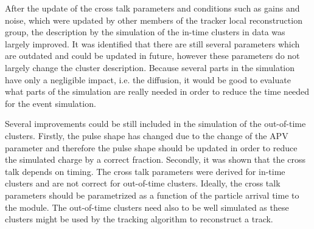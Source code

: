 


After the update of the cross talk parameters and conditions such as gains and noise, which were updated by other members of the tracker local reconstruction group, the description by the simulation of the in-time clusters in data was largely improved. It was identified that there are still several parameters which are outdated and could be  updated in future, however these parameters do not largely change the cluster description. Because several parts in the simulation have only a negligible impact, i.e. the diffusion, it would be good to evaluate what parts of the simulation are really needed in order to reduce the time needed for the event simulation.

Several improvements could be still included in the simulation of the out-of-time clusters. Firstly, the pulse shape has changed due to the change of the APV parameter and therefore the pulse shape should be updated in order to reduce the simulated charge by a correct fraction. Secondly, it was shown that the cross talk depends on timing. The cross talk parameters were derived for in-time clusters and are not correct for out-of-time clusters. Ideally, the cross talk parameters should be parametrized as a function of the particle arrival time to the module. The out-of-time clusters need also to be well simulated as these clusters might be used by the tracking algorithm to reconstruct a track.

